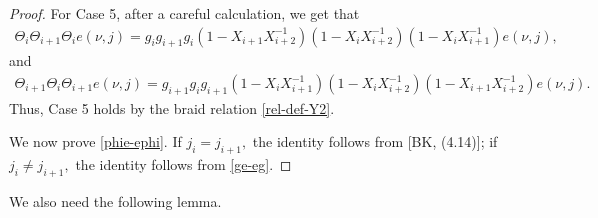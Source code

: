 \documentclass[11pt, reqno]{amsart} \textwidth=14.9cm \oddsidemargin=1cm \evensidemargin=1cm
\theoremstyle{definition}
\numberwithin{equation}{section}
\begin{document}
\begin{proof}
For Case 5, after a careful calculation, we get that
\begin{align*}\Theta_{i}\Theta_{i+1}\Theta_{i}e(\nu, j)=g_{i}g_{i+1}g_{i}(1-X_{i+1}X_{i+2}^{-1})(1-X_{i}X_{i+2}^{-1})(1-X_{i}X_{i+1}^{-1})e(\nu, j),\end{align*}
and
\begin{align*}\Theta_{i+1}\Theta_{i}\Theta_{i+1}e(\nu, j)=g_{i+1}g_{i}g_{i+1}(1-X_{i}X_{i+1}^{-1})(1-X_{i}X_{i+2}^{-1})(1-X_{i+1}X_{i+2}^{-1})e(\nu, j).\end{align*}
Thus, Case 5 holds by the braid relation \eqref{rel-def-Y2}.

We now prove \eqref{phie-ephi}. If $j_{i}=j_{i+1},$ the identity follows from [BK, (4.14)]; if $j_{i}\neq j_{i+1},$ the identity follows from \eqref{ge-eg}.
\end{proof}

We also need the following lemma.
\end{document}
